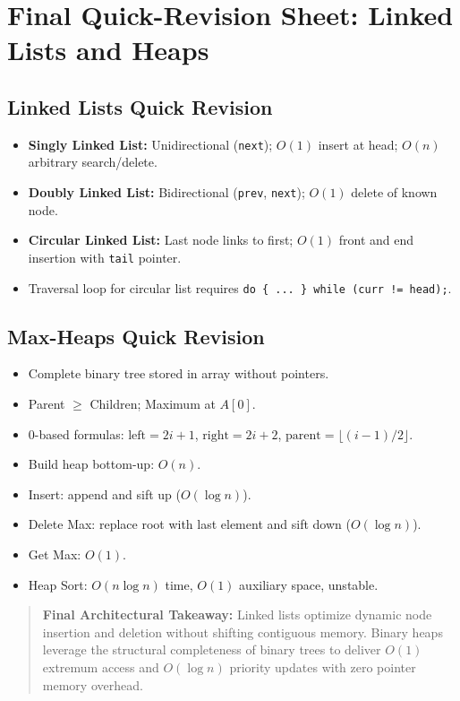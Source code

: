 \section{Final Quick-Revision Sheet: Linked Lists and Heaps}

\subsection{Linked Lists Quick Revision}
\begin{itemize}
    \item \textbf{Singly Linked List:} Unidirectional (\texttt{next}); $O(1)$ insert at head; $O(n)$ arbitrary search/delete.
    \item \textbf{Doubly Linked List:} Bidirectional (\texttt{prev}, \texttt{next}); $O(1)$ delete of known node.
    \item \textbf{Circular Linked List:} Last node links to first; $O(1)$ front and end insertion with \texttt{tail} pointer.
    \item Traversal loop for circular list requires \texttt{do \{ ... \} while (curr != head);}.
\end{itemize}

\subsection{Max-Heaps Quick Revision}
\begin{itemize}
    \item Complete binary tree stored in array without pointers.
    \item Parent $\geq$ Children; Maximum at $A[0]$.
    \item 0-based formulas: $\text{left} = 2i + 1$, $\text{right} = 2i + 2$, $\text{parent} = \lfloor(i-1)/2\rfloor$.
    \item Build heap bottom-up: $O(n)$.
    \item Insert: append and sift up ($O(\log n)$).
    \item Delete Max: replace root with last element and sift down ($O(\log n)$).
    \item Get Max: $O(1)$.
    \item Heap Sort: $O(n \log n)$ time, $O(1)$ auxiliary space, unstable.
\end{itemize}

\begin{quote}
\textbf{Final Architectural Takeaway:} Linked lists optimize dynamic node insertion and deletion without shifting contiguous memory. Binary heaps leverage the structural completeness of binary trees to deliver $O(1)$ extremum access and $O(\log n)$ priority updates with zero pointer memory overhead.
\end{quote}


